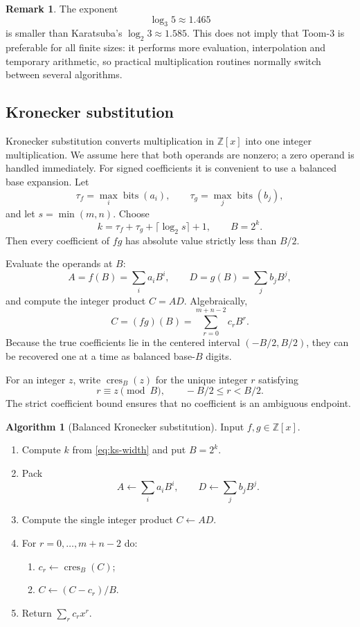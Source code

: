\documentclass[11pt]{book}
\theoremstyle{definition}
\newtheorem{algorithm}[theorem]{Algorithm}
\newtheorem{remark}[theorem]{Remark}
\newcommand{\ZZ}{\mathbb Z}
\newcommand{\bits}{\operatorname{bits}}
\begin{document}
\begin{remark}
The exponent
\[
 \log_3 5\approx1.465
\]
is smaller than Karatsuba's $\log_2 3\approx1.585$.  This does not imply that
Toom-3 is preferable for all finite sizes: it performs more evaluation,
interpolation and temporary arithmetic, so practical multiplication routines
normally switch between several algorithms.
\end{remark}

\subsection{Kronecker substitution}

Kronecker substitution converts multiplication in $\ZZ[x]$ into one integer
multiplication.  We assume here that both operands are nonzero; a zero operand is
handled immediately.  For signed coefficients it is convenient to use a balanced
base expansion.  Let
\[
 \tau_f=\max_i\bits(a_i),
 \qquad
 \tau_g=\max_j\bits(b_j),
\]
and let $s=\min(m,n)$.  Choose
\begin{equation}\label{eq:ks-width}
 k=\tau_f+\tau_g+\lceil\log_2 s\rceil+1,
 \qquad B=2^k.
\end{equation}
Then every coefficient of $fg$ has absolute value strictly less than $B/2$.

Evaluate the operands at $B$:
\[
 A=f(B)=\sum_i a_iB^i,
 \qquad
 D=g(B)=\sum_j b_jB^j,
\]
and compute the integer product $C=AD$.  Algebraically,
\begin{equation}\label{eq:ks-packed-product}
 C=(fg)(B)=\sum_{r=0}^{m+n-2}c_rB^r.
\end{equation}
Because the true coefficients lie in the centered interval
$(-B/2,B/2)$, they can be recovered one at a time as balanced base-$B$ digits.

For an integer $z$, write $\operatorname{cres}_B(z)$ for the unique integer
$r$ satisfying
\[
 r\equiv z\pmod B,
 \qquad -B/2\leq r<B/2.
\]
The strict coefficient bound ensures that no coefficient is an ambiguous
endpoint.

\begin{algorithm}[Balanced Kronecker substitution]\label{alg:kronecker-product}
Input $f,g\in\ZZ[x]$.
\begin{enumerate}
 \item Compute $k$ from \eqref{eq:ks-width} and put $B=2^k$.
 \item Pack
 \[
    A\leftarrow\sum_i a_iB^i,
    \qquad D\leftarrow\sum_j b_jB^j.
 \]
 \item Compute the single integer product $C\leftarrow AD$.
 \item For $r=0,\ldots,m+n-2$ do:
 \begin{enumerate}
  \item $c_r\leftarrow\operatorname{cres}_B(C)$;
  \item $C\leftarrow(C-c_r)/B$.
 \end{enumerate}
 \item Return $\sum_r c_rx^r$.
\end{enumerate}
\end{algorithm}
\end{document}
